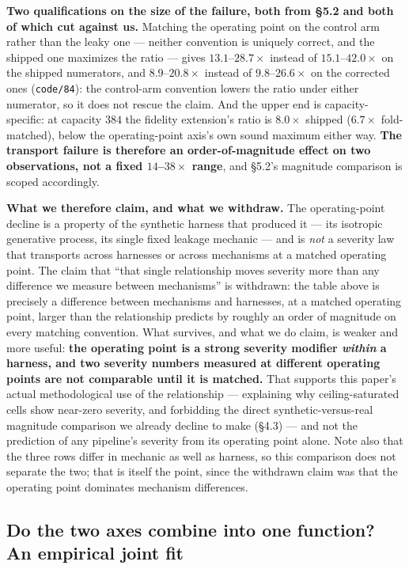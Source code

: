 \documentclass[10pt]{article} %
\begin{document}
\textbf{Two qualifications on the size of the failure, both from §5.2 and both
of which cut against us.} Matching the operating point on the control arm
rather than the leaky one --- neither convention is uniquely correct, and the
shipped one maximizes the ratio --- gives $13.1$--$28.7\times$ instead of
$15.1$--$42.0\times$ on the shipped numerators, and $8.9$--$20.8\times$ instead
of $9.8$--$26.6\times$ on the corrected ones (\texttt{code/84}): the
control-arm convention lowers the ratio under either numerator, so it does not
rescue the claim. And the upper end is
capacity-specific: at capacity $384$ the fidelity extension's ratio is
$8.0\times$ shipped ($6.7\times$ fold-matched), below the operating-point
axis's own sound maximum either way. \textbf{The transport failure is therefore
an order-of-magnitude effect on two observations, not a fixed
$14$--$38\times$ range}, and §5.2's magnitude comparison is scoped accordingly.

\textbf{What we therefore claim, and what we withdraw.} The operating-point
decline is a property of the synthetic harness that produced it --- its
isotropic generative process, its single fixed leakage mechanic --- and is
\emph{not} a severity law that transports across harnesses or across mechanisms
at a matched operating point. The claim that ``that single relationship moves
severity more than any difference we measure between mechanisms'' is withdrawn:
the table above is precisely a difference between mechanisms and harnesses, at
a matched operating point, larger than the relationship predicts by roughly an
order of magnitude on every matching convention. What survives, and what we do
claim, is weaker and more useful: \textbf{the operating point is a strong
severity modifier \emph{within} a harness, and two severity numbers measured at
different operating points are not comparable until it is matched.} That
supports this paper's actual methodological use of the relationship ---
explaining why ceiling-saturated cells show near-zero severity, and forbidding
the direct synthetic-versus-real magnitude comparison we already decline to
make (§4.3) --- and not the prediction of any pipeline's severity from its
operating point alone. Note also that the three rows differ in mechanic as well
as harness, so this comparison does not separate the two; that is itself the
point, since the withdrawn claim was that the operating point dominates
mechanism differences.

\subsection{Do the two axes combine into one function? An empirical joint fit}
\end{document}
